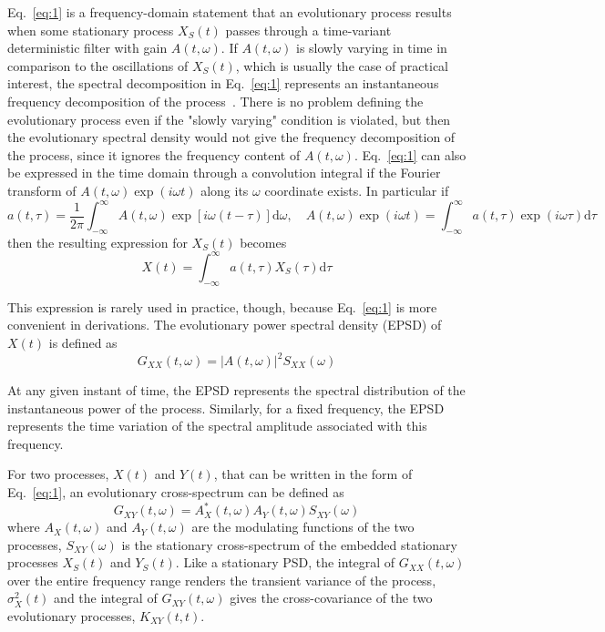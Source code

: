 \documentclass[12pt]{article}
\begin{document}
Eq.~\eqref{eq:1} is a frequency-domain statement that an evolutionary process results when some stationary process $X_{S}(t)$ passes through a time-variant deterministic filter with gain $A(t, \omega)$. If $A(t, \omega)$ is slowly varying in time in comparison to the oscillations of $X_{S}(t)$, which is usually the case of practical interest, the spectral decomposition in Eq.~\eqref{eq:1} represents an instantaneous frequency decomposition of the process~\cite{Priestley1965}. There is no problem defining the evolutionary process even if the "slowly varying" condition is violated, but then the evolutionary spectral density would not give the frequency decomposition of the process, since it ignores the frequency content of $A(t, \omega)$. Eq.~\eqref{eq:1} can also be expressed in the time domain through a convolution integral if the Fourier transform of $A(t, \omega) \exp (i \omega t)$ along its $\omega$ coordinate exists. In particular if
\begin{equation}
a(t, \tau)=\frac{1}{2 \pi} \int_{-\infty}^{\infty} A(t, \omega) \exp [i \omega(t-\tau)] \mathrm{d} \omega, \quad A(t, \omega) \exp (i \omega t)=\int_{-\infty}^{\infty} a(t, \tau) \exp (i \omega \tau) \mathrm{d} \tau
\label{eq:4}
\end{equation}
then the resulting expression for $X_{S}(t)$ becomes
\begin{equation}
X(t)=\int_{-\infty}^{\infty} a(t, \tau) X_{S}(\tau) \mathrm{d} \tau
\label{eq:5}
\end{equation}

This expression is rarely used in practice, though, because Eq.~\eqref{eq:1} is more convenient in derivations. The evolutionary power spectral density (EPSD) of $X(t)$ is defined as
\begin{equation}
G_{X X}(t, \omega)=|A(t, \omega)|^{2} S_{X X}(\omega)
\label{eq:6}
\end{equation}

At any given instant of time, the EPSD represents the spectral distribution of the instantaneous power of the process. Similarly, for a fixed frequency, the EPSD represents the time variation of the spectral amplitude associated with this frequency.

For two processes, $X(t)$ and $Y(t)$, that can be written in the form of Eq.~\eqref{eq:1}, an evolutionary cross-spectrum can be defined as
\begin{equation}
G_{X Y}(t, \omega)=A_{X}^{*}(t, \omega) A_{Y}(t, \omega) S_{X Y}(\omega)
\label{eq:7}
\end{equation}
where $A_{X}(t, \omega)$ and $A_{Y}(t, \omega)$ are the modulating functions of the two processes, $S_{X Y}(\omega)$ is the stationary cross-spectrum of the embedded stationary processes $X_{S}(t)$ and $Y_{S}(t)$. Like a stationary PSD, the integral of $G_{X X}(t, \omega)$ over the entire frequency range renders the transient variance of the process, $\sigma_{X}^{2}(t)$ and the integral of $G_{X Y}(t, \omega)$ gives the cross-covariance of the two evolutionary processes, $K_{X Y}(t, t)$.
\end{document}
